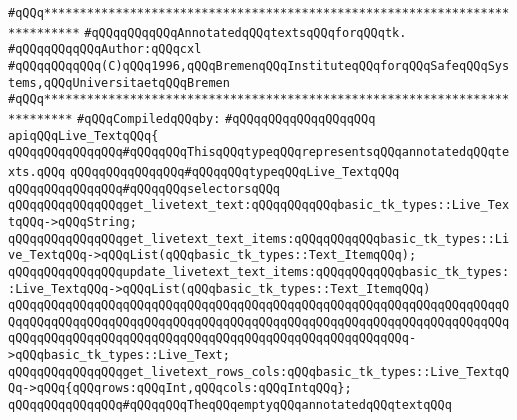 \label{src/lib/tk/src/live_text.api}
\verb|#qQQq***************************************************************************|\newline
\verb|#qQQqqQQqqQQqAnnotatedqQQqtextsqQQqforqQQqtk.|\newline
\verb|#qQQqqQQqqQQqAuthor:qQQqcxl|\newline
\verb|#qQQqqQQqqQQq(C)qQQq1996,qQQqBremenqQQqInstituteqQQqforqQQqSafeqQQqSystems,qQQqUniversitaetqQQqBremen|\newline
\verb|#qQQq**************************************************************************|\newline
\newline
\verb|#qQQqCompiledqQQqby:|\newline
\verb|#qQQqqQQqqQQqqQQqqQQq|\newline
\newline
\verb|apiqQQqLive_TextqQQq{|\newline
\newline
\verb|qQQqqQQqqQQqqQQq#qQQqqQQqThisqQQqtypeqQQqrepresentsqQQqannotatedqQQqtexts.qQQq|\newline
\verb|qQQqqQQqqQQqqQQq#qQQqqQQqtypeqQQqLive_TextqQQq|\newline
\newline
\verb|qQQqqQQqqQQqqQQq#qQQqqQQqselectorsqQQq|\newline
\verb|qQQqqQQqqQQqqQQqget_livetext_text:qQQqqQQqqQQqbasic_tk_types::Live_TextqQQq->qQQqString;|\newline
\verb|qQQqqQQqqQQqqQQqget_livetext_text_items:qQQqqQQqqQQqbasic_tk_types::Live_TextqQQq->qQQqList(qQQqbasic_tk_types::Text_ItemqQQq);|\newline
\verb|qQQqqQQqqQQqqQQqupdate_livetext_text_items:qQQqqQQqqQQqbasic_tk_types::Live_TextqQQq->qQQqList(qQQqbasic_tk_types::Text_ItemqQQq)|\newline
\verb|qQQqqQQqqQQqqQQqqQQqqQQqqQQqqQQqqQQqqQQqqQQqqQQqqQQqqQQqqQQqqQQqqQQqqQQqqQQqqQQqqQQqqQQqqQQqqQQqqQQqqQQqqQQqqQQqqQQqqQQqqQQqqQQqqQQqqQQqqQQqqQQqqQQqqQQqqQQqqQQqqQQqqQQqqQQqqQQqqQQqqQQqqQQqqQQqqQQq->qQQqbasic_tk_types::Live_Text;|\newline
\verb|qQQqqQQqqQQqqQQqget_livetext_rows_cols:qQQqbasic_tk_types::Live_TextqQQq->qQQq{qQQqrows:qQQqInt,qQQqcols:qQQqIntqQQq};|\newline
\newline
\verb|qQQqqQQqqQQqqQQq#qQQqqQQqTheqQQqemptyqQQqannotatedqQQqtextqQQq|\newline
